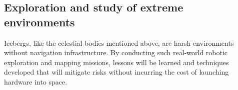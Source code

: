 %
%



\subsection{Exploration and study of extreme environments}

Icebergs, like the celestial bodies mentioned above, are harsh environments without navigation infrastructure. By conducting such real-world robotic exploration and mapping missions, lessons will be learned and techniques developed that will mitigate risks without incurring the cost of launching hardware into space. 

